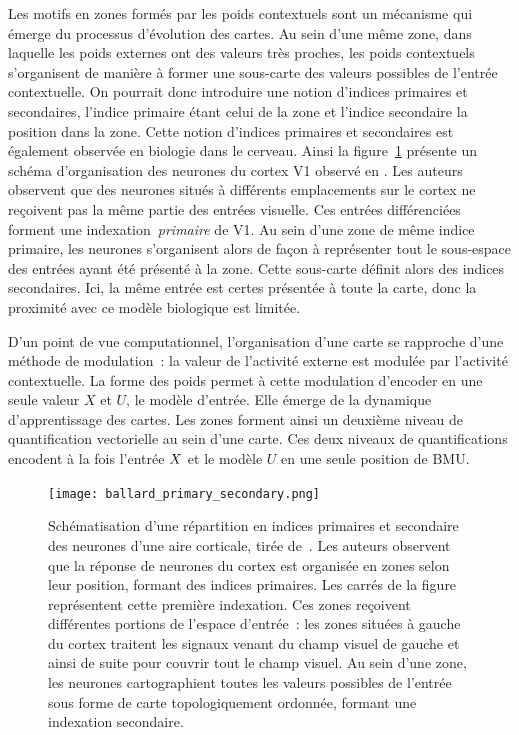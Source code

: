 \documentclass[../main]{subfiles}
\begin{document}
Les motifs en zones formés par les poids contextuels sont un mécanisme qui émerge du processus d'évolution des cartes.
Au sein d'une même zone, dans laquelle les poids externes ont des valeurs très proches, les poids contextuels s'organisent de manière à former une sous-carte des valeurs possibles de l'entrée contextuelle.
On pourrait donc introduire une notion d'indices primaires et secondaires, l'indice primaire étant celui de la zone et l'indice secondaire la position dans la zone.
Cette notion d'indices primaires et secondaires est également observée en biologie dans le cerveau. Ainsi la figure~\ref{fig:ballard} présente un schéma d'organisation des neurones du cortex V1 observé en \cite{ballard_cortical_1986}.
Les auteurs observent que des neurones situés à différents emplacements sur le cortex ne reçoivent pas la même partie des entrées visuelle. 
Ces entrées différenciées forment une indexation~\emph{primaire} de V1. 
Au sein d'une zone de même indice primaire, les neurones s'organisent alors de façon à représenter tout le sous-espace des entrées ayant été présenté à la zone. Cette sous-carte définit alors des indices secondaires.
Ici, la même entrée est certes présentée à toute la carte, donc la proximité avec ce modèle biologique est limitée. 

D'un point de vue computationnel, l'organisation d'une carte se rapproche d'une méthode de modulation~: la valeur de l'activité externe est modulée par l'activité contextuelle. La forme des poids permet à cette modulation d'encoder en une seule valeur $X$ et $U$, le modèle d'entrée. Elle émerge de la dynamique d'apprentissage des cartes.
Les zones forment ainsi un deuxième niveau de quantification vectorielle au sein d'une carte. Ces deux niveaux de quantifications encodent à la fois l'entrée $X$ et le modèle $U$ en une seule position de BMU.

\begin{figure}[h!]
	\centering\texttt{[image: ballard\_primary\_secondary.png]}
	\caption{Schématisation d'une répartition en indices primaires et secondaire des neurones d'une aire corticale, tirée de~\cite{ballard_cortical_1986}. 
	Les auteurs observent que la réponse de neurones du cortex est organisée en zones selon leur position, formant des indices primaires. Les carrés de la figure représentent cette première indexation.
	Ces zones reçoivent différentes portions de l'espace d'entrée~: les zones situées à gauche du cortex traitent les signaux venant du champ visuel de gauche et ainsi de suite pour couvrir tout le champ visuel.
	Au sein d'une zone, les neurones cartographient toutes les valeurs possibles de l'entrée sous forme de carte topologiquement ordonnée, formant une indexation secondaire. \label{fig:ballard}}
\end{figure}
\end{document}
